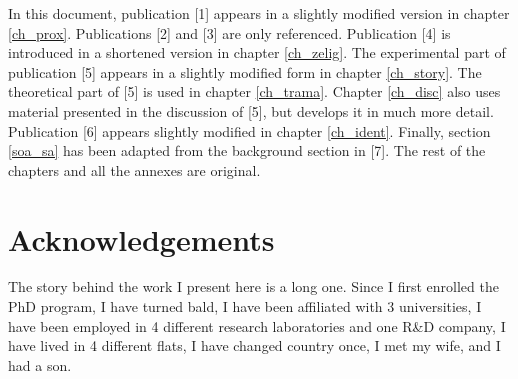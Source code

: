 \documentclass[
		twoside,openright,titlepage,numbers=noenddot,manychapters,
		headinclude,%
                footinclude=false,cleardoublepage=empty,
                BCOR=5mm,
		fontsize=11pt, %
                 enabledeprecatedfontcommands]{scrreprt}
\begin{document}
\begin{titlepage}
\begin{addmargin}[0cm]{0cm}
\begin{small}
\noindent In this document, publication [1] appears in a slightly modified version in chapter \ref{ch_prox}. Publications [2] and [3] are only referenced. Publication [4] is introduced in a shortened version in chapter \ref{ch_zelig}. The experimental part of publication [5] appears in a slightly modified form in chapter \ref{ch_story}. The theoretical part of [5] is used in chapter \ref{ch_trama}. Chapter \ref{ch_disc} also uses material presented in the discussion of [5], but develops it in much more detail. Publication [6] appears slightly modified in chapter \ref{ch_ident}. Finally, section \ref{soa_sa} has been adapted from the background section in [7]. The rest of the chapters and all the annexes are original.
\end{small} 



\end{addmargin}
\end{titlepage}

\cleardoublepage



%
%
%







\pagestyle{scrheadings} %

\chapter*{Acknowledgements}

{}
\thispagestyle{empty}
The story behind the work I present here is a long one. Since I first enrolled the PhD program, I have turned bald, I have been affiliated with 3 universities, I have been employed in 4 different research laboratories and one R\&D company, I have lived in 4 different flats, I have changed country once, I met my wife, and I had a son. 
\end{document}

